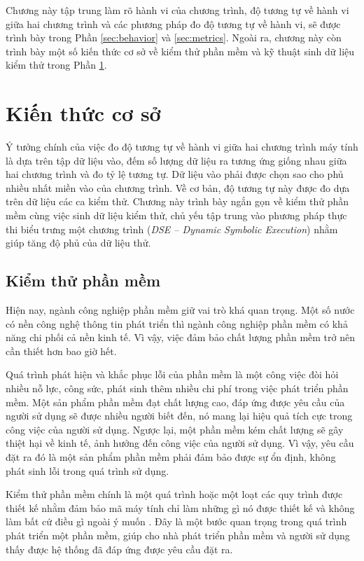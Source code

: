 Chương này tập trung làm rõ hành vi của chương trình, độ tương tự về
hành vi giữa hai chương trình và các phương pháp đo độ tương tự về
hành vi, sẽ được trình bày trong Phần \ref{sec:behavior} và
\ref{sec:metrics}. Ngoài ra, chương này còn trình bày một số kiến thức
cơ sở về kiểm thử phần mềm và kỹ thuật sinh dữ liệu kiểm thử trong
Phần \ref{sec:base}.

\section{Kiến thức cơ sở}
\label{sec:base}

Ý tưởng chính của việc đo độ tương tự về hành vi giữa hai chương trình
máy tính là dựa trên tập dữ liệu vào, đếm số lượng dữ liệu ra tương
ứng giống nhau giữa hai chương trình và đo tỷ lệ tương tự. Dữ liệu vào
phải được chọn sao cho phủ nhiều nhất miền vào của chương trình. Về cơ
bản, độ tương tự này được đo dựa trên dữ liệu các ca kiểm thử. Chương
này trình bày ngắn gọn về kiểm thử phần mềm cùng việc sinh dữ liệu
kiểm thử, chủ yếu tập trung vào phương pháp thực thi biểu trưng một
chương trình (\emph{DSE -- Dynamic Symbolic Execution}) nhằm giúp tăng độ phủ
của dữ liệu thử.

\subsection{Kiểm thử phần mềm}
Hiện nay, ngành công nghiệp phần mềm giữ vai trò khá quan trọng. Một
số nước có nền công nghệ thông tin phát triển thì ngành công nghiệp
phần mềm có khả năng chi phối cả nền kinh tế. Vì vậy, việc đảm bảo
chất lượng phần mềm trở nên cần thiết hơn bao giờ hết.

Quá trình phát hiện và khắc phục lỗi của phần mềm là một công việc đòi hỏi nhiều nỗ lực, công sức, phát sinh thêm nhiều chi phí trong việc phát triển phần mềm. Một sản phẩm phần mềm đạt chất lượng cao, đáp ứng được yêu cầu của người sử dụng sẽ được nhiều người biết đến, nó mang lại hiệu quả tích cực trong công việc của người sử dụng. Ngược lại, một phần mềm kém chất lượng sẽ gây thiệt hại về kinh tế, ảnh hưởng đến công việc của người sử dụng. Vì vậy, yêu cầu đặt ra đó là một sản phẩm phần mềm phải đảm bảo được sự ổn định, không phát sinh lỗi trong quá trình sử dụng.

Kiểm thử phần mềm chính là một quá trình hoặc một loạt các quy trình
được thiết kế nhằm đảm bảo mã máy tính chỉ làm những gì nó được thiết
kế và không làm bất cứ điều gì ngoài ý muốn \cite{myers2011art}. Đây
là một bước quan trọng trong quá trình phát triển một phần mềm, giúp
cho nhà phát triển phần mềm và người sử dụng thấy được hệ thống đã đáp
ứng được yêu cầu đặt ra.

